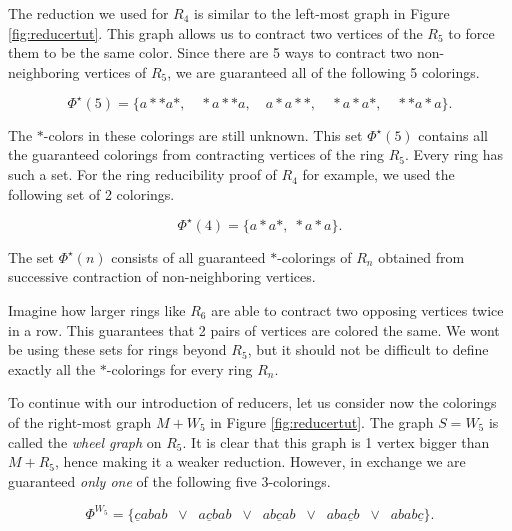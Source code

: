 The reduction we used for $R_4$ is similar to the left-most graph in Figure \ref{fig:reducertut}. This graph allows us to contract two vertices of the $R_5$ to force them to be the same color. Since there are 5 ways to contract two non-neighboring vertices of $R_5$, we are guaranteed all of the following 5 colorings.

\begin{equation}
    \Phi^\star(5) = \{ a{*}{*}a{*}, \quad {*}a{*}{*}a, \quad a{*}a{*}{*}, \quad {*}a{*}a{*}, \quad {*}{*}a{*}a \}.
\end{equation}

The ${*}$-colors in these colorings are still unknown. This set $\Phi^\star(5)$ contains all the guaranteed colorings from contracting vertices of the ring $R_5$. Every ring has such a set. For the ring reducibility proof of $R_4$ for example, we used the following set of 2 colorings.

\begin{equation}
    \Phi^\star(4) = \{ a{*}a{*}, \; {*}a{*}a \}.
\end{equation}

\begin{definition}
    The set $\Phi^\star(n)$ consists of all guaranteed ${*}$-colorings of $R_n$ obtained from successive contraction of non-neighboring vertices.
\end{definition}

Imagine how larger rings like $R_6$ are able to contract two opposing vertices twice in a row. This guarantees that 2 pairs of vertices are colored the same. We wont be using these sets for rings beyond $R_5$, but it should not be difficult to define exactly all the ${*}$-colorings for every ring $R_n$.

To continue with our introduction of reducers, let us consider now the colorings of the right-most graph $M+W_5$ in Figure \ref{fig:reducertut}. The graph $S=W_5$ is called the \textit{wheel graph} on $R_5$. It is clear that this graph is 1 vertex bigger than $M+R_5$, hence making it a weaker reduction. However, in exchange we are guaranteed \textit{only one} of the following five 3-colorings.

\begin{equation}
    \Phi^{W_5} = \{ \underline{c}abab\;\;\lor\;\; 
            a\underline{c}bab\;\;\lor\;\;
            ab\underline{c}ab\;\;\lor\;\;
            aba\underline{c}b\;\;\lor\;\;
            abab\underline{c} \}.
\end{equation}

